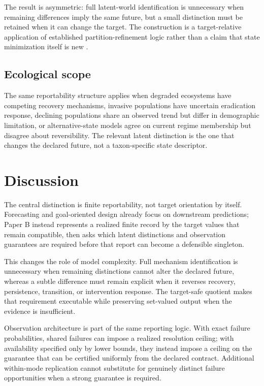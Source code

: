 \documentclass[11pt]{article}
\begin{document}
The result is asymmetric: full latent-world identification is unnecessary when remaining differences imply the same future, but a small distinction must be retained when it can change the target. The construction is a target-relative application of established partition-refinement logic rather than a claim that state minimization itself is new \cite{GivanDeanGreig2003}.

\subsection{Ecological scope}
The same reportability structure applies when degraded ecosystems have competing recovery mechanisms, invasive populations have uncertain eradication response, declining populations share an observed trend but differ in demographic limitation, or alternative-state models agree on current regime membership but disagree about reversibility. The relevant latent distinction is the one that changes the declared future, not a taxon-specific state descriptor.

\section{Discussion}
The central distinction is finite reportability, not target orientation by itself. Forecasting and goal-oriented design already focus on downstream predictions; Paper B instead represents a realized finite record by the target values that remain compatible, then asks which latent distinctions and observation guarantees are required before that report can become a defensible singleton.

This changes the role of model complexity. Full mechanism identification is unnecessary when remaining distinctions cannot alter the declared future, whereas a subtle difference must remain explicit when it reverses recovery, persistence, transition, or intervention response. The target-safe quotient makes that requirement executable while preserving set-valued output when the evidence is insufficient.

Observation architecture is part of the same reporting logic. With exact failure probabilities, shared failures can impose a realized resolution ceiling; with availability specified only by lower bounds, they instead impose a ceiling on the guarantee that can be certified uniformly from the declared contract. Additional within-mode replication cannot substitute for genuinely distinct failure opportunities when a strong guarantee is required.
\end{document}
